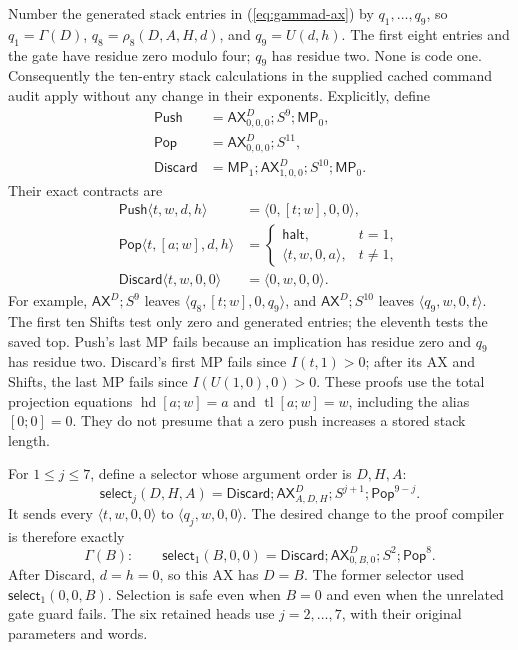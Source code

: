 Number the generated stack entries in (\ref{eq:gammad-ax}) by
\(q_1,\ldots,q_9\), so \(q_1=\Gamma(D)\),
\(q_8=\rho_8(D,A,H,d)\), and \(q_9=U(d,h)\).
The first eight entries and the gate have residue zero modulo four;
\(q_9\) has residue two.  None is code one.  Consequently the
ten-entry stack calculations in the supplied cached command audit apply
without any change in their exponents.  Explicitly, define
\begin{align*}
 \mathsf{Push}&=\mathsf{AX}^{D}_{0,0,0};S^9;\mathsf{MP}_0,\\
 \mathsf{Pop}&=\mathsf{AX}^{D}_{0,0,0};S^{11},\\
 \mathsf{Discard}&=\mathsf{MP}_1;\mathsf{AX}^{D}_{1,0,0};S^{10};\mathsf{MP}_0.
\end{align*}
Their exact contracts are
\begin{align*}
 \mathsf{Push}\langle t,w,d,h\rangle
   &=\langle0,[t;w],0,0\rangle,\\
 \mathsf{Pop}\langle t,[a;w],d,h\rangle
   &=\begin{cases}\mathsf{halt},&t=1,\\
                    \langle t,w,0,a\rangle,&t\ne1,
      \end{cases}\\
 \mathsf{Discard}\langle t,w,0,0\rangle
   &=\langle0,w,0,0\rangle.
\end{align*}
For example, \(\mathsf{AX}^{D};S^9\) leaves
\(\langle q_8,[t;w],0,q_9\rangle\), and
\(\mathsf{AX}^{D};S^{10}\) leaves
\(\langle q_9,w,0,t\rangle\).  The first ten Shifts test only zero
and generated entries; the eleventh tests the saved top.  Push's last
MP fails because an implication has residue zero and \(q_9\) has
residue two.  Discard's first MP fails since \(I(t,1)>0\); after
its AX and Shifts, the last MP fails since \(I(U(1,0),0)>0\).
These proofs use the total projection equations
\(\operatorname{hd}[a;w]=a\) and
\(\operatorname{tl}[a;w]=w\), including the alias \([0;0]=0\).
They do not presume that a zero push increases a stored stack length.

For \(1\le j\le7\), define a selector whose argument order is
\emph{\(D,H,A\)}:
\[
 \mathsf{select}_{j}(D,H,A)=
 \mathsf{Discard};\mathsf{AX}^{D}_{A,D,H};S^{j+1};
                                      \mathsf{Pop}^{9-j}.
\]
It sends every \(\langle t,w,0,0\rangle\) to
\(\langle q_j,w,0,0\rangle\).  The desired change to the proof
compiler is therefore exactly
\[
 \boxed{\quad
 \Gamma(B):\qquad\mathsf{select}_{1}(B,0,0)
       =\mathsf{Discard};\mathsf{AX}^{D}_{0,B,0};S^2;\mathsf{Pop}^{8}.
 \quad}
 \tag{D-Sel}\label{eq:gammad-selector}
\]
After Discard, \(d=h=0\), so this AX has \(D=B\).  The former
selector used \(\mathsf{select}_1(0,0,B)\).  Selection is safe even
when \(B=0\) and even when the unrelated gate guard fails.
The six retained heads use \(j=2,\ldots,7\), with their original
parameters and words.

